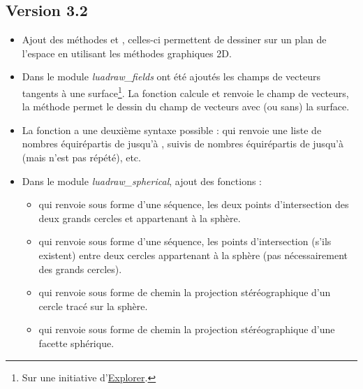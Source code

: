\subsection{Version 3.2}

\begin{itemize}
    \item Ajout des méthodes  et , celles-ci permettent de dessiner sur un plan de l'espace en utilisant les méthodes graphiques 2D.

    \item Dans le module \emph{luadraw\_fields} ont été ajoutés les champs de vecteurs tangents à une surface\footnote{Sur une initiative d'\href{https://tex.stackexchange.com/users/322482/explorer}{Explorer}.}. La fonction  calcule et renvoie le champ de vecteurs, la méthode  permet le dessin du champ de vecteurs avec (ou sans) la surface.
    
    \item La fonction  a une deuxième syntaxe possible :  qui renvoie une liste de  nombres équirépartis de  jusqu'à , suivis de  nombres équirépartis de  jusqu'à  (mais  n'est pas répété), etc.

    \item Dans le module \emph{luadraw\_spherical}, ajout des fonctions : 
        \begin{itemize}
            \item {} qui renvoie sous forme d'une séquence, les deux points d'intersection des deux grands cercles  et  appartenant à la sphère.
            
            \item {} qui renvoie sous forme d'une séquence, les points d'intersection (s'ils existent) entre deux cercles appartenant à la sphère (pas nécessairement des grands cercles).
            
            \item {} qui renvoie sous forme de chemin la projection stéréographique d'un cercle tracé sur la sphère.
            
            \item {} qui renvoie sous forme de chemin la projection stéréographique d'une facette sphérique.
        \end{itemize}
    

\end{itemize}
